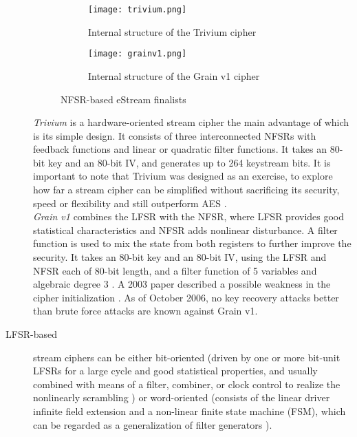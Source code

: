 \begin{description}
	\begin{figure}[h]
		
		\begin{subfigure}{0.5\textwidth}
			\texttt{[image: trivium.png]} 
			\caption{Internal structure of the Trivium cipher}
			\label{fig:trivium}
		\end{subfigure}
		\begin{subfigure}{0.5\textwidth}
			\texttt{[image: grainv1.png]} 
			\caption{Internal structure of the Grain v1 cipher}
			\label{fig:grainv1}
		\end{subfigure}
		
		\caption{NFSR-based eStream finalists}
		\label{fig:nfsr}
		
	\end{figure}
	
	\emph{Trivium} is a hardware-oriented stream cipher the main advantage of which is its simple design. It consists of three interconnected NFSRs with feedback functions and linear or quadratic filter functions. It takes an 80-bit key and an 80-bit IV, and generates up to 264 keystream bits. It is important to note that Trivium was designed as an exercise, to explore how far a stream cipher can be simplified without sacrificing its security, speed or flexibility and still outperform AES \cite{canniere2008trivium}.\\
	\emph{Grain v1} combines the LFSR with the NFSR, where LFSR provides good statistical characteristics and NFSR adds nonlinear disturbance. A filter function is used to mix the state from both registers to further improve the security. It takes an 80-bit key and an 80-bit IV, using the LFSR and NFSR each of 80-bit length, and a filter function of 5 variables and algebraic degree 3 \cite{hell2007grain}. A 2003 paper described a possible weakness in the cipher initialization \cite{kuccuk2006slide}. As of October 2006, no key recovery attacks better than brute force attacks are known against Grain v1.
	
	\item [LFSR-based] stream ciphers can be either bit-oriented (driven by one or more bit-unit LFSRs for a large cycle and good statistical properties, and usually combined with means of a filter, combiner, or clock control to realize the nonlinearly scrambling \cite{jiao2020stream}) or word-oriented (consists of the linear driver infinite field extension and a non-linear finite state machine (FSM), which can be regarded as a generalization of filter generators \cite{jiao2020stream}).
	

\end{description}
